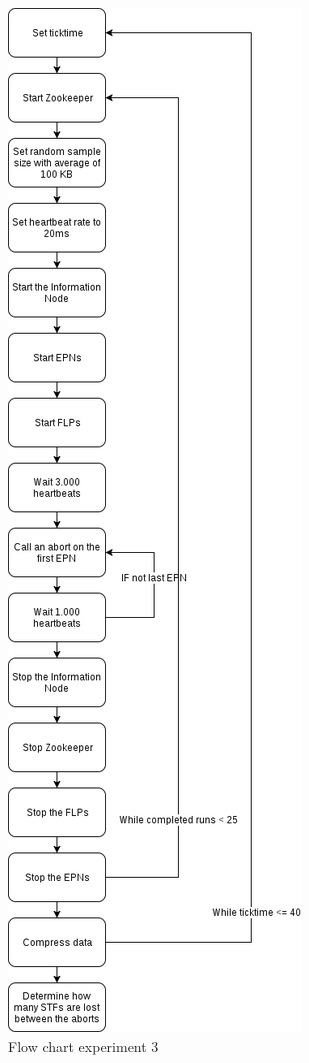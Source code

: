 \begin{figure}[htb]
    \centering
    \includegraphics[scale=0.3]{./graphics/ex3.png}
    \caption{Flow chart experiment 3}
    \label{fig:FlowChart3}
\end{figure}

